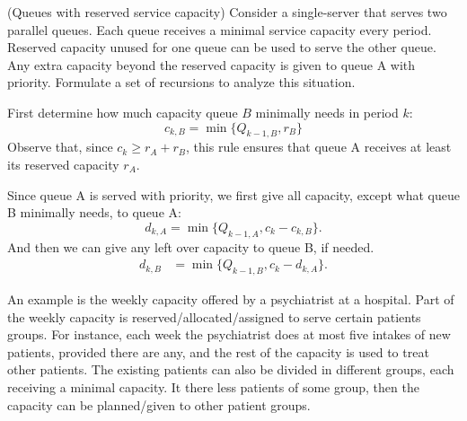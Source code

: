 \begin{question} 
  (Queues with reserved service capacity) Consider a single-server that
  serves two parallel queues. Each queue receives a minimal service
  capacity every period. Reserved capacity unused for one queue can be
  used to serve the other queue. Any extra capacity beyond the
  reserved capacity is given to queue A with priority. Formulate a set
  of recursions to analyze this situation.
  \begin{solution}
    First determine how much capacity queue $B$ minimally needs in
    period $k$:
    \begin{equation*}
      c_{k,B} = \min\{Q_{ k-1, B}, r_B\}
    \end{equation*}
    Observe that, since $c_k \geq r_A + r_B$, this rule ensures that
    queue A receives at least its reserved capacity $r_A$. 

    Since queue A is served with priority, we first give all capacity,
    except what queue B minimally needs, to queue A:
    \begin{equation*}
d_{k,A} = \min\{Q_{k-1, A}, c_k-c_{k,B}\}.
\end{equation*}
And then we can give any left over capacity to queue B, if needed. 
\begin{align*}
d_{k,B} &= \min\{Q_{k-1, B}, c_k-d_{k,A}\}.
\end{align*}

    An example is the weekly capacity offered by a psychiatrist at a
    hospital. Part of the weekly capacity is
    reserved/allocated/assigned to serve certain patients groups. For
    instance, each week the psychiatrist does at most five intakes of
    new patients, provided there are any, and the rest of the capacity
    is used to treat other patients. The existing patients can also be
    divided in different groups, each receiving a minimal capacity. It
    there less patients of some group, then the capacity can be
    planned/given to other patient groups. 

  \end{solution}
\end{question}


